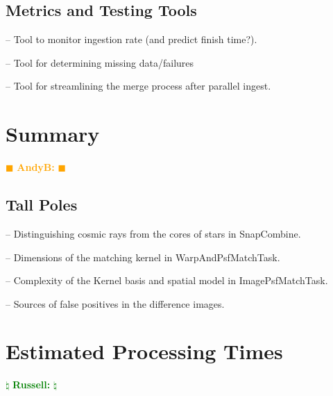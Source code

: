 \documentclass[12pt]{article}
\newcommand{\becker} { \textcolor{orange} {
\ensuremath{\blacksquare} {\bf AndyB:}  
\ensuremath{\blacksquare} } }
\newcommand{\russ} { \textcolor{green} {
\ensuremath{\natural} {\bf Russell:}  
\ensuremath{\natural} } }
\begin{document}
\subsection{Metrics and Testing Tools}

-- Tool to monitor ingestion rate (and predict finish time?).

-- Tool for determining missing data/failures

-- Tool for streamlining the merge process after parallel ingest.


\clearpage 
\section{Summary} \becker

\subsection{Tall Poles}

-- Distinguishing cosmic rays from the cores of stars in SnapCombine.

-- Dimensions of the matching kernel in WarpAndPsfMatchTask.

-- Complexity of the Kernel basis and spatial model in ImagePsfMatchTask.

-- Sources of false positives in the difference images.



\clearpage 
\section{Estimated Processing Times} \russ
\end{document}
